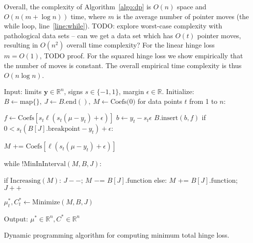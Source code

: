 \documentclass{article}
\begin{document}
Overall, the complexity of Algorithm~\ref{algo:dp} is $O(n)$ space and
$O(n (m + \log n))$ time, where $m$ is the average number of pointer moves
(the while loop, line~\ref{line:while}). TODO: explore worst-case
complexity with pathological data sets -- can we get a data set which
has $O(t)$ pointer moves, resulting in $O(n^2)$ overall time
complexity? For the linear hinge loss $m=O(1)$, TODO proof. For the
squared hinge loss we show empirically that the number of moves is
constant. The overall empirical time complexity is thus $O(n\log n)$.

\begin{algorithm}[H]
\begin{algorithmic}[1]
\STATE Input: 
limits $\mathbf y\in\mathbb R^n$, 
signs $s\in\{-1,1\}$, 
margin $\epsilon\in\mathbb R$.
\STATE Initialize: 
$B\gets\text{map}\{\},\ J\gets B.\text{end}(),\ M\gets\text{Coefs(0)}$
\STATE for data points $t$ from 1 to $n$:
\begin{ALC@g}
  \STATE $f\gets\text{Coefs}[s_t\ell(s_t(\mu-y_t)+\epsilon)]$
  \STATE $b\gets y_t - s_t\epsilon$
  \STATE $B.\text{insert}(b, f)$ \label{line:insert}
  \STATE if $0 < s_t(B[J].\text{breakpoint}-y_t)+\epsilon$:
  \begin{ALC@g}
    \STATE $M$ += $\text{Coefs}[\ell(s_t(\mu-y_t)+\epsilon)]$
    \label{line:add-coefs}
  \end{ALC@g}
  \STATE while $!\text{MinInInterval}(M,B,J)$:
  \label{line:while}
  \begin{ALC@g}
    \STATE if $\text{Increasing}(M)$: $J--$; $M$ $-$= $B[J].\text{function}$
    \label{line:increasing}
    \STATE else: $M$ += $B[J].\text{function}$; $J++$
    \label{line:else}
  \end{ALC@g}
  \STATE $\mu_t^*, C_t^*\gets\text{Minimize}(M,B,J)$
  \label{line:Minimize}
\end{ALC@g}
\STATE Output: $\mu^*\in\mathbb R^n, C^*\in\mathbb R^n$
\caption{\label{algo:dp}Dynamic programming algorithm for
  computing minimum total hinge loss.}
\end{algorithmic}
\end{algorithm}
\end{document}
